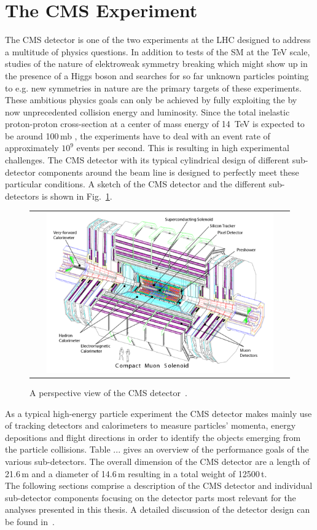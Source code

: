 \section{The CMS Experiment}
\label{sec:cms}
The CMS detector is one of the two experiments at the LHC designed to address a multitude of physics questions. In addition to tests of the SM at the TeV scale, studies of the nature of elektroweak symmetry breaking which might show up in the presence of a Higgs boson and searches for so far unknown particles pointing to e.g. new symmetries in nature are the primary targets of these experiments. These ambitious physics goals can only be achieved by fully exploiting the by now unprecedented collision energy and luminosity. Since the total inelastic proton-proton cross-section at a center of mass energy of 14~TeV is expected to be around 100\,mb , the experiments have to deal with an event rate of approximately $10^9$ events per second. This is resulting in high experimental challenges. The CMS detector with its typical cylindrical design of different sub-detector components around the beam line is designed to perfectly meet these particular conditions. A sketch of the CMS detector and the different sub-detectors is shown in Fig.~\ref{fig:CMS}.
\begin{figure}[!tp]
  \centering
  \begin{tabular}{c}
    \includegraphics[width=0.9\textwidth]{figures/CMSDetector.pdf}
  \end{tabular}
  \caption{A perspective view of the CMS detector~\cite{Chatrchyan:2008zzk}.}
  \label{fig:CMS}
\end{figure}
As a typical high-energy particle experiment the CMS detector makes mainly use of tracking detectors and calorimeters to measure particles' momenta, energy depositions and flight directions in order to identify the objects emerging from the particle collisions. Table ...  gives an overview of the performance goals of the various sub-detectors. The overall dimension of the CMS detector are a length of 21.6\,m and a diameter of 14.6\,m resulting in a total weight of 12500\,t. \\  
The following sections comprise a description of the CMS detector and individual sub-detector components focusing on the detector parts most relevant for the analyses presented in this thesis. A detailed discussion of the detector design can be found in~\cite{Chatrchyan:2008zzk, bib:cmsptdr1}.

